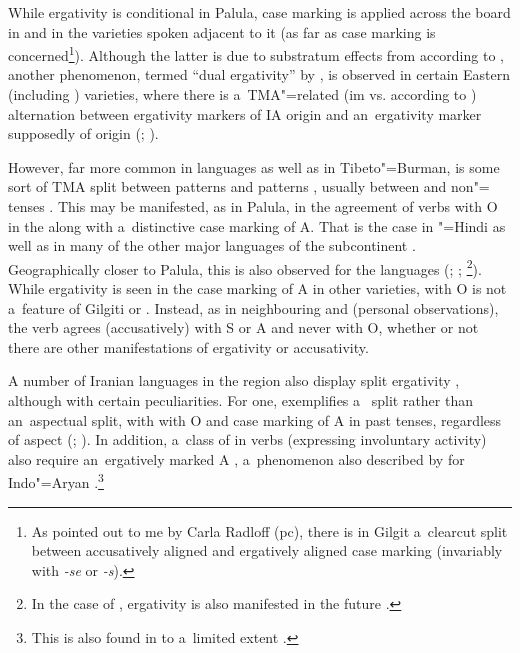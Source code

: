While ergativity is conditional in Palula,  case marking is applied across the board in \iliBurushaski and in the \iliShina varieties spoken adjacent to it (as far as case marking is concerned\footnote{As pointed out to me by Carla Radloff (pc), there is in Gilgit \iliShina a~clearcut split between accusatively aligned  and ergatively aligned case marking (invariably with \textit{-se} or \textit{-s}).}). Although the latter is due to substratum effects from \iliBurushaski according to \citet[248]{masica2001}, another phenomenon, termed ``dual ergativity'' by \citet[213]{hookkoul2004}, is observed in certain Eastern (including \iliKohistani) \iliShina varieties, where there is a~TMA"=related (im vs.  according to \citealt[51--53]{schmidtkohistani2008}) alternation between ergativity markers of IA origin and an~ergativity marker supposedly of \iliTibetan origin (\citealt[214]{hookkoul2004}; \citealt[211]{bailey1924}). 


\largerpage
However, far more common in \iliNIA languages as well as in Tibeto"=Burman, is some sort of TMA split between  patterns and  patterns \citep[248]{masica2001}, usually between  and non"= tenses \citep[342--343]{masica1991}. This may be manifested, as in Palula, in the agreement of  verbs with O in the  along with a~distinctive case marking of A. That is the case in \iliUrdu"=Hindi \citep[124]{schmidt1999} as well as in many of the other major \iliNIA languages of the subcontinent \citep[248]{masica2001}. Geographically closer to Palula, this is also observed for the \iliKohistani languages (\citealt[136]{baart1999a}; \citealt[34]{hallberghallberg1999}; \citealt[93--95]{lunsford2001}\footnote{In the case of \iliTorwali, ergativity is also manifested in the future .}). While ergativity is seen in the case marking of A in other \iliShina varieties,  with O is not a~feature of Gilgiti or \iliKohistani \iliShina. Instead, as in neighbouring \iliDameli and \iliGawarbati (personal observations), the verb agrees (accusatively) with S or A and never with O, whether or not there are other manifestations of ergativity or accusativity.



A number of Iranian languages in the region also display split ergativity \citep{payne1980}, although with certain peculiarities. For one, \iliPashto exemplifies a~ split rather than an~aspectual split, with  with O and  case marking of A in past tenses, regardless of aspect (\citealt[4--5]{tegey1977}; \citealt[71--72]{lorenz1979}). In addition, a~class of in verbs (expressing involuntary activity) also require an~ergatively marked A \citep[112]{babrakzai1999}, a~phenomenon also described by \citet[217]{hookkoul2004} for Indo"=Aryan \iliKashmiri.\footnote{This is also found in \iliUrdu to a~limited extent \citep[168]{schmidt1999}.} 



